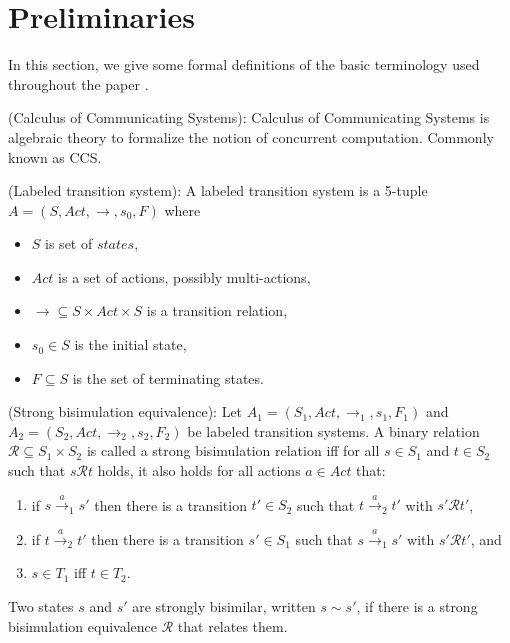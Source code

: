\section{Preliminaries}
\label{sec:preliminaries}

In this section, we give some formal definitions of the basic terminology used throughout the paper \cite{ReactiveSystems}\cite{ModellingAndAnalysis}\cite{WeakBisimulation}.

\begin{definition}
(Calculus of Communicating Systems): Calculus of Communicating Systems is algebraic theory to formalize the notion of concurrent computation. Commonly known as CCS.
\end{definition}

\begin{definition}
(Labeled transition system): A labeled transition system is a 5-tuple $A=\left(S, Act, \rightarrow, s_{0}, F \right)$ where
\begin{itemize}
	\item $S$ is set of $states$,
	\item $Act$ is a set of actions, possibly multi-actions,
	\item $\rightarrow \subseteq S \times Act \times S$ is a transition relation,
	\item $s_{0} \in S$ is the initial state,
	\item $F \subseteq S$ is the set of terminating states.	
\end{itemize}
\end{definition}

\begin{definition}
(Strong bisimulation equivalence): Let $A_{1}=\left(S_{1}, Act, \rightarrow_{1}, s_{1}, F_{1}\right)$ and $A_{2}=\left(S_{2}, Act, \rightarrow_{2}, s_{2}, F_{2}\right)$ be labeled transition systems. A binary relation $\mathcal{R} \subseteq S_{1} \times S_{2}$ is called a strong bisimulation relation iff for all $s \in S_{1}$ and $t \in S_{2}$ such that $s\mathcal{R} t$ holds, it also holds for all actions $a \in Act$ that:
\begin{enumerate}
\item if $s\stackrel{a}{\rightarrow}_{1}s'$ then there is a transition $t' \in S_{2}$ such that $t\stackrel{a}{\rightarrow}_{2}t'$ with $s'\mathcal{R} t'$,
\item if $t\stackrel{a}{\rightarrow}_{2}t'$ then there is a transition $s' \in S_{1}$ such that $s\stackrel{a}{\rightarrow}_{1}s'$ with $s'\mathcal{R} t'$, and
\item $s \in T_{1}$ iff $t \in T_{2}$.
\end{enumerate}
Two states $s$ and $s'$ are strongly bisimilar, written $s\sim s'$, if there is a strong bisimulation equivalence $\mathcal{R}$ that relates them.
\end{definition}

